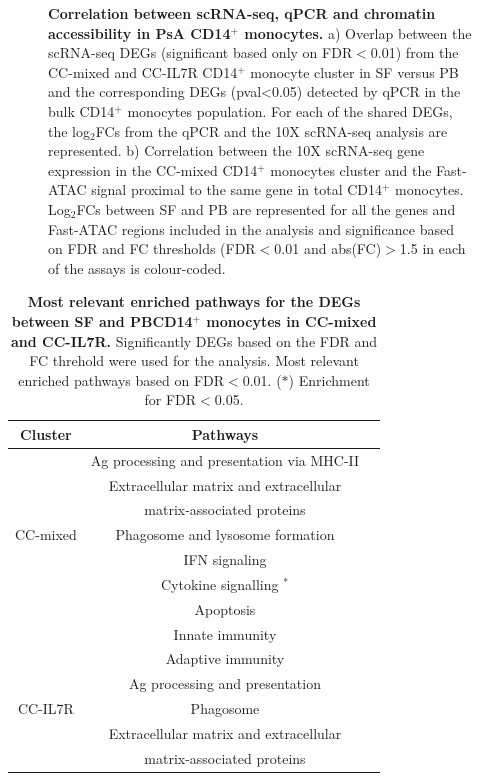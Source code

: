 \begin{figure}[H]
\caption[Correlation between scRNA-seq, qPCR and chromatin accessibility in PsA CD14$^+$ monocytes.]{\textbf{Correlation between scRNA-seq, qPCR and chromatin accessibility in PsA CD14$^+$ monocytes.} a) Overlap between the scRNA-seq DEGs (significant based only on FDR$<$0.01) from the CC-mixed and CC-IL7R CD14$^+$ monocyte cluster in SF versus PB and the corresponding DEGs (pval<0.05) detected by qPCR in the bulk CD14$^+$ monocytes population. For each of the shared DEGs, the log$_2$FCs from the qPCR and the 10X scRNA-seq analysis are represented. b) Correlation between the 10X scRNA-seq gene expression in the CC-mixed CD14$^+$ monocytes cluster and the Fast-ATAC signal proximal to the same gene in total CD14$^+$ monocytes. Log$_2$FCs between SF and PB are represented for all the genes and Fast-ATAC regions included in the analysis and significance based on FDR and FC thresholds (FDR$<$0.01 and abs(FC)$>$1.5 in each of the assays is colour-coded.}
\label{figure:PsA_scRNAseq_qPCR_ATAC_correlation}
\end{figure}




\begin{table}[htbp]
\centering
\begin{tabular}{@{} c c c}
\toprule
\textbf{Cluster} & \textbf{Pathways} \\
\midrule
\midrule
         & Ag processing and presentation via MHC-II \\
				 & Extracellular matrix and extracellular \\
				 & matrix-associated proteins \\
CC-mixed & Phagosome and lysosome formation \\
				 & IFN signaling & \\
				 & Cytokine signalling $^\ast$ \\
				 & Apoptosis \\
				 & Innate immunity \\
\midrule				
         & Adaptive immunity \\
         & Ag processing and presentation \\
CC-IL7R	 & Phagosome \\
         & Extracellular matrix and extracellular \\
				 & matrix-associated proteins \\
\bottomrule
\end{tabular}
\medskip %
\caption[Most relevant enriched pathways for the DEGs between SF and PBCD14$^+$ monocytes in CC-mixed and CC-IL7R.]{\textbf{Most relevant enriched pathways for the DEGs between SF and PBCD14$^+$ monocytes in CC-mixed and CC-IL7R.} Significantly DEGs based on the FDR and FC threhold were used for the analysis. Most relevant enriched pathways based on FDR$<$0.01. ($\ast$) Enrichment for FDR$<$0.05.}
\label{tab:PSA_scRNAseq_CD14_DEGs_pathway_analysis}
\end{table}


